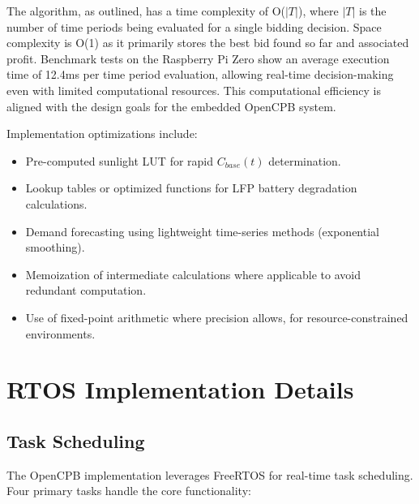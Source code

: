 \documentclass[11pt,a4paper]{article}
\begin{document}
The algorithm, as outlined, has a time complexity of O($|T|$), where $|T|$ is the number of time periods being evaluated for a single bidding decision. Space complexity is O(1) as it primarily stores the best bid found so far and associated profit. Benchmark tests on the Raspberry Pi Zero show an average execution time of 12.4ms per time period evaluation, allowing real-time decision-making even with limited computational resources. This computational efficiency is aligned with the design goals for the embedded OpenCPB system.

Implementation optimizations include:
\begin{itemize}
    \item Pre-computed sunlight LUT for rapid $C_{base}(t)$ determination.
    \item Lookup tables or optimized functions for LFP battery degradation calculations.
    \item Demand forecasting using lightweight time-series methods (exponential smoothing).
    \item Memoization of intermediate calculations where applicable to avoid redundant computation.
    \item Use of fixed-point arithmetic where precision allows, for resource-constrained environments.
\end{itemize}

\section{RTOS Implementation Details}
\subsection{Task Scheduling}

The OpenCPB implementation leverages FreeRTOS for real-time task scheduling. Four primary tasks handle the core functionality:
\end{document}

